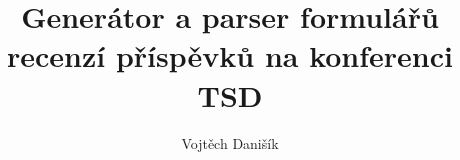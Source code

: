 \documentclass[czech,BP]{thesiskiv}
\author{Vojtěch Danišík}
\title{Generátor a parser formulářů recenzí příspěvků na konferenci TSD}
\begin{document}
%
\maketitle
\tableofcontents



% 
%

{\raggedright\small

}
\end{document}
